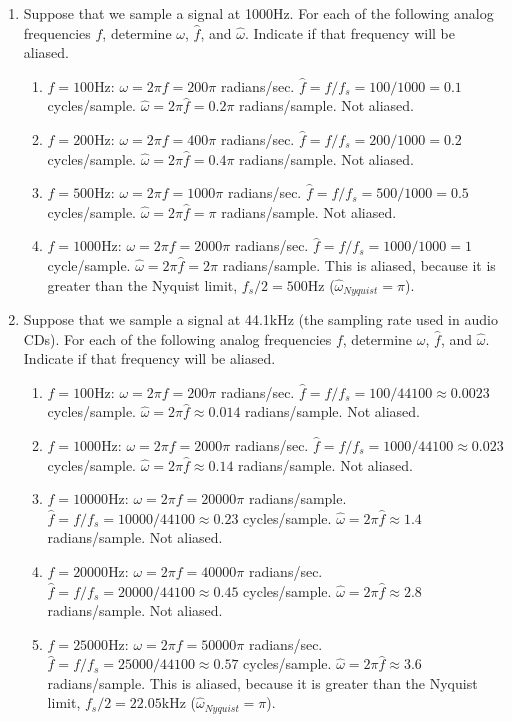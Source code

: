 \begin{enumerate}
\item Suppose that we sample a signal at 1000Hz. For each of the
  following analog frequencies $f$, determine $\omega$,
  $\hat{f}$, and $\hat{\omega}$. Indicate if that frequency will be
  aliased.\label{it:ch3ex2.2}
  \begin{enumerate}
  \item $f=100$Hz: $\omega = 2\pi f = 200\pi$ radians/sec.
    $\hat{f} = f/f_s = 100/1000 = 0.1$ cycles/sample.
    $\hat{\omega} = 2\pi \hat{f} = 0.2\pi$ radians/sample. Not aliased.
  \item $f=200$Hz: $\omega = 2\pi f = 400\pi$ radians/sec.
    $\hat{f} = f/f_s = 200/1000 = 0.2$ cycles/sample.
    $\hat{\omega} = 2\pi \hat{f} = 0.4\pi$ radians/sample. Not aliased.
  \item $f=500$Hz: $\omega = 2\pi f = 1000\pi$ radians/sec.
    $\hat{f} = f/f_s = 500/1000 = 0.5$ cycles/sample.
    $\hat{\omega} = 2\pi \hat{f} = \pi$ radians/sample. Not aliased.
  \item $f=1000$Hz: $\omega = 2\pi f = 2000\pi$ radians/sec.
    $\hat{f} = f/f_s = 1000/1000 = 1$ cycle/sample.
    $\hat{\omega} = 2\pi \hat{f} = 2\pi$ radians/sample. This is
    aliased, because it is greater than the Nyquist limit, $f_s/2 =
    500$Hz ($\hat{\omega}_{\mathit{Nyquist}} = \pi$).
  \end{enumerate}

\item Suppose that we sample a signal at 44.1kHz (the sampling rate
  used in audio CDs). For each of the following analog frequencies
  $f$, determine $\omega$, $\hat{f}$, and $\hat{\omega}$. Indicate if
  that frequency will be aliased.\label{it:ch3ex2.3}
  \begin{enumerate}
  \item $f=100$Hz: $\omega = 2\pi f = 200\pi$ radians/sec.
    $\hat{f} = f/f_s = 100/44100 \approx 0.0023$ cycles/sample.
    $\hat{\omega} = 2\pi \hat{f} \approx 0.014$ radians/sample. Not aliased.
  \item $f=1000$Hz: $\omega = 2\pi f = 2000\pi$ radians/sec.
    $\hat{f} = f/f_s = 1000/44100 \approx 0.023$ cycles/sample.
    $\hat{\omega} = 2\pi \hat{f} \approx 0.14$ radians/sample. Not aliased.
  \item $f=10000$Hz: $\omega = 2\pi f = 20000\pi$ radians/sample.
    $\hat{f} = f/f_s = 10000/44100 \approx 0.23$ cycles/sample.
    $\hat{\omega} = 2\pi \hat{f} \approx 1.4$ radians/sample. Not aliased.
  \item $f=20000$Hz: $\omega = 2\pi f = 40000\pi$ radians/sec.
    $\hat{f} = f/f_s = 20000/44100 \approx 0.45$ cycles/sample.
    $\hat{\omega} = 2\pi \hat{f} \approx 2.8$ radians/sample. Not aliased.
  \item $f=25000$Hz: $\omega = 2\pi f = 50000\pi$ radians/sec.
    $\hat{f} = f/f_s = 25000/44100 \approx 0.57$ cycles/sample.
    $\hat{\omega} = 2\pi \hat{f} \approx 3.6$ radians/sample. This is
    aliased, because it is greater than the Nyquist limit, $f_s/2 =
    22.05$kHz ($\hat{\omega}_{\mathit{Nyquist}} = \pi$).
  \end{enumerate}



\end{enumerate}
